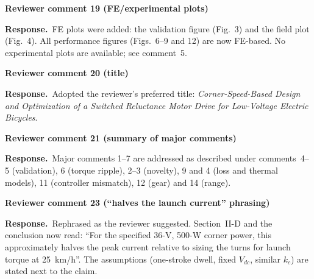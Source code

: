 \documentclass[10pt]{article}
\newcommand{\rev}[1]{\par\medskip\noindent\textbf{Reviewer comment #1}\par}
\newcommand{\resp}{\par\noindent\textcolor{blue!50!black}{\textbf{Response.}}~}
\begin{document}
\rev{19 (FE/experimental plots)}
\resp FE plots were added: the validation figure (Fig.~3) and the field plot
(Fig.~4). All performance figures (Figs.~6--9 and 12) are now FE-based. No
experimental plots are available; see comment~5.

\rev{20 (title)}
\resp Adopted the reviewer's preferred title: \emph{Corner-Speed-Based Design
and Optimization of a Switched Reluctance Motor Drive for Low-Voltage Electric
Bicycles}.

\rev{21 (summary of major comments)}
\resp Major comments 1--7 are addressed as described under comments~4--5
(validation), 6 (torque ripple), 2--3 (novelty), 9 and 4 (loss and thermal
models), 11 (controller mismatch), 12 (gear) and 14 (range).

\rev{23 (``halves the launch current'' phrasing)}
\resp Rephrased as the reviewer suggested. Section~II-D and the conclusion now
read: ``For the specified 36-V, 500-W corner power, this approximately halves
the peak current relative to sizing the turns for launch torque at 25~km/h''.
The assumptions (one-stroke dwell, fixed $V_{dc}$, similar $k_c$) are stated
next to the claim.
\end{document}
